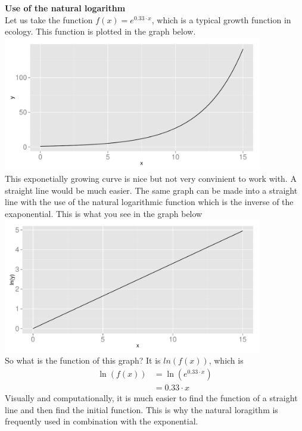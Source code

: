 \documentclass[a4paper]{report}
\begin{document}
\begin{mdframed}
\textbf{Use of the natural logarithm}\\
Let us take the function $f(x)= e^{0.33\cdot x}$, which is a typical growth function in ecology. This function is plotted in the graph below.\\
\includegraphics[width=0.85\textwidth]{example_e_plot.pdf}\\
This exponetially growing curve is nice but not very convinient to work with. A straight line would be much easier. The same graph can be made into a straight line with the use of the natural logarithmic function which is the inverse of the exaponential. This is what you see in the graph below\\
\includegraphics[width=0.85\textwidth]{example_ln_plot.pdf}\\
So what is the function of this graph? It is $ln(f(x))$, which is
\begin{equation}
\begin{aligned}
\ln(f(x))&=\ln(e^{0.33\cdot x})\\
&=0.33\cdot x 
\end{aligned}
\end{equation}
Visually and computationally,  it is much easier to find the function of a straight line and then find the initial function. This is why the natural loragithm is frequently used in combination with the exponential. 
\end{mdframed}
\end{document}
